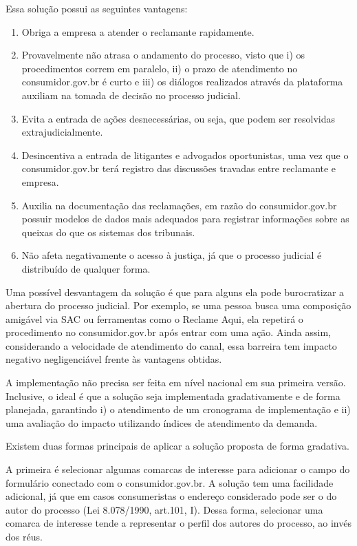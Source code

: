\documentclass[]{report}
\providecommand{\tightlist}{%
  \setlength{\itemsep}{0pt}\setlength{\parskip}{0pt}}
\begin{document}
Essa solução possui as seguintes vantagens:

\begin{enumerate}
\def\labelenumi{\arabic{enumi}.}
\tightlist
\item
  Obriga a empresa a atender o reclamante rapidamente.
\item
  Provavelmente não atrasa o andamento do processo, visto que i) os
  procedimentos correm em paralelo, ii) o prazo de atendimento no
  consumidor.gov.br é curto e iii) os diálogos realizados através da
  plataforma auxiliam na tomada de decisão no processo judicial.
\item
  Evita a entrada de ações desnecessárias, ou seja, que podem ser
  resolvidas extrajudicialmente.
\item
  Desincentiva a entrada de litigantes e advogados oportunistas, uma vez
  que o consumidor.gov.br terá registro das discussões travadas entre
  reclamante e empresa.
\item
  Auxilia na documentação das reclamações, em razão do consumidor.gov.br
  possuir modelos de dados mais adequados para registrar informações
  sobre as queixas do que os sistemas dos tribunais.
\item
  Não afeta negativamente o acesso à justiça, já que o processo judicial
  é distribuído de qualquer forma.
\end{enumerate}

Uma possível desvantagem da solução é que para alguns ela pode
burocratizar a abertura do processo judicial. Por exemplo, se uma pessoa
busca uma composição amigável via SAC ou ferramentas como o Reclame
Aqui, ela repetirá o procedimento no consumidor.gov.br após entrar com
uma ação. Ainda assim, considerando a velocidade de atendimento do
canal, essa barreira tem impacto negativo negligenciável frente às
vantagens obtidas.

A implementação não precisa ser feita em nível nacional em sua primeira
versão. Inclusive, o ideal é que a solução seja implementada
gradativamente e de forma planejada, garantindo i) o atendimento de um
cronograma de implementação e ii) uma avaliação do impacto utilizando
índices de atendimento da demanda.

Existem duas formas principais de aplicar a solução proposta de forma
gradativa.

A primeira é selecionar algumas comarcas de interesse para adicionar o
campo do formulário conectado com o consumidor.gov.br. A solução tem uma
facilidade adicional, já que em casos consumeristas o endereço
considerado pode ser o do autor do processo (Lei 8.078/1990, art.101,
I). Dessa forma, selecionar uma comarca de interesse tende a representar
o perfil dos autores do processo, ao invés dos réus.
\end{document}
